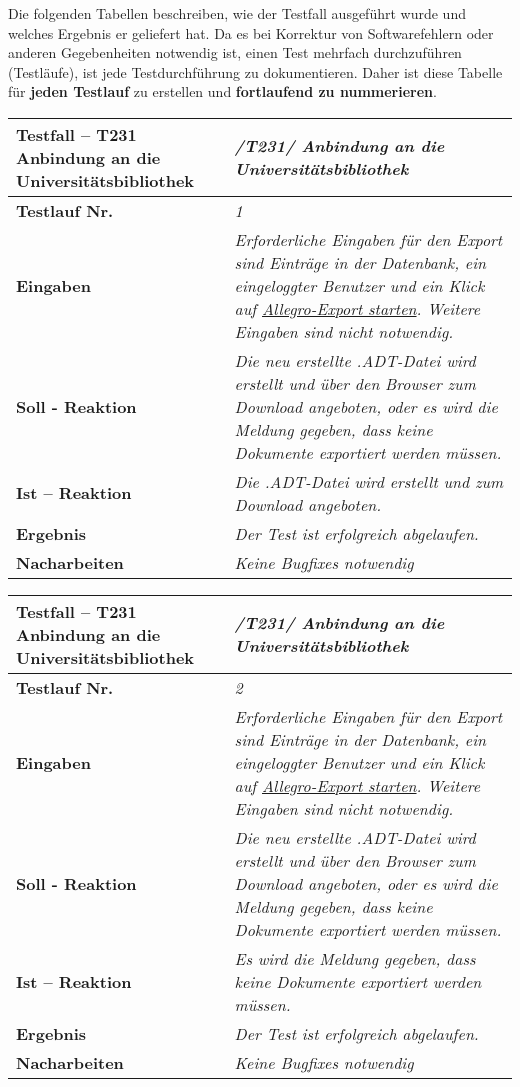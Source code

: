 Die folgenden Tabellen beschreiben, wie der Testfall ausgef\"uhrt wurde und
welches Ergebnis er geliefert hat. Da es bei Korrektur von Softwarefehlern oder
anderen Gegebenheiten notwendig ist, einen Test mehrfach durchzuf\"uhren
(Testl\"aufe), ist jede Testdurchf\"uhrung zu dokumentieren. Daher ist diese
Tabelle f\"ur \textbf{jeden Testlauf }  zu erstellen und \textbf{ fortlaufend zu
nummerieren}. \\


\begin{longtable}{|p{5cm}|p{10cm}|}
\hline
\textbf{Testfall -- T231 Anbindung an die Universitätsbibliothek} &
\textit{/T231/ Anbindung an die Universitätsbibliothek} \\
\hline 
\textbf{Testlauf Nr.} & \textit{1} \\
\hline
\textbf{Eingaben} & \textit{Erforderliche Eingaben für den Export sind Einträge in der
Datenbank, ein eingeloggter Benutzer und ein Klick auf \uline{Allegro-Export
starten}. Weitere Eingaben sind nicht notwendig. } \\
\hline
\textbf{Soll - Reaktion} & \textit{Die neu erstellte .ADT-Datei wird erstellt
und über den Browser zum Download angeboten, oder es wird die Meldung gegeben,
dass keine Dokumente exportiert werden müssen. } \\
\hline
\textbf{Ist -- Reaktion} & \textit{Die .ADT-Datei wird erstellt und zum
Download angeboten. } \\
\hline
\textbf{Ergebnis} & \textit{Der Test ist erfolgreich abgelaufen. } \\
\hline
\textbf{Nacharbeiten } & \textit{Keine Bugfixes notwendig} \\
\hline
\end{longtable}

\begin{longtable}{|p{5cm}|p{10cm}|}
\hline
\textbf{Testfall -- T231 Anbindung an die Universitätsbibliothek} &
\textit{/T231/ Anbindung an die Universitätsbibliothek} \\
\hline 
\textbf{Testlauf Nr.} & \textit{2} \\
\hline
\textbf{Eingaben} & \textit{Erforderliche Eingaben für den Export sind Einträge in der
Datenbank, ein eingeloggter Benutzer und ein Klick auf \uline{Allegro-Export
starten}. Weitere Eingaben sind nicht notwendig. } \\
\hline
\textbf{Soll - Reaktion} & \textit{Die neu erstellte .ADT-Datei wird erstellt
und über den Browser zum Download angeboten, oder es wird die Meldung gegeben,
dass keine Dokumente exportiert werden müssen. } \\
\hline
\textbf{Ist -- Reaktion} & \textit{Es wird die Meldung gegeben, dass keine
Dokumente exportiert werden müssen. } \\
\hline
\textbf{Ergebnis} & \textit{Der Test ist erfolgreich abgelaufen. } \\
\hline
\textbf{Nacharbeiten } & \textit{Keine Bugfixes notwendig} \\
\hline
\end{longtable}
